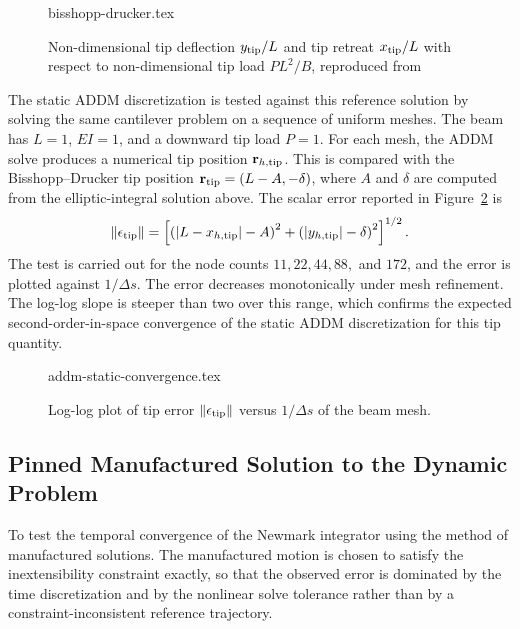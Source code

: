 \begin{figure}[H]
    \centering
    {bisshopp-drucker.tex}
    \caption{Non-dimensional tip deflection \(y_{\rm tip}/L\) and tip retreat \(x_{\rm tip}/L\) with respect to non-dimensional tip load \(PL^2/B\), reproduced from \textcite{bisshopp_large_1945}}
    \label{fig:bisshopp-drucker-reference}
\end{figure}

The static ADDM discretization is tested against this reference solution by
solving the same cantilever problem on a sequence of uniform meshes. The beam
has \(L=1\), \(EI=1\), and a downward tip load \(P=1\). For each mesh, the ADDM
solve produces a numerical tip position \(\vec r_{h,\rm tip}\). This is
compared with the Bisshopp--Drucker tip position \(\vec r_{\rm
tip}=(L-A,-\delta)\), where \(A\) and \(\delta\) are computed from the
elliptic-integral solution above. The scalar error reported in
Figure~\ref{fig:bisshopp-drucker-convergence} is
\begin{equation*}
    \norm{\vec \epsilon_{\rm tip}}
    =
    \left[
        \left(\abs{L-x_{h,\rm tip}}-A\right)^2
        +
        \left(\abs{y_{h,\rm tip}}-\delta\right)^2
        \right]^{1/2}.
\end{equation*}
The test is carried out for the node counts
\(11,22,44,88,\) and \(172\), and the error is plotted against
\(1/\Delta s\). The error decreases monotonically under mesh refinement. The
log-log slope is steeper than two over this range, which confirms the expected
second-order-in-space convergence of the static ADDM discretization for this
tip quantity.

\begin{figure}[H]
    \centering
    {addm-static-convergence.tex}
    \caption{Log-log plot of tip error \(\norm{\vec {\epsilon}_{\rm tip}}\) versus \(1/\Delta s\) of the beam mesh.}
    \label{fig:bisshopp-drucker-convergence}
\end{figure}

\subsection{Pinned Manufactured Solution to the Dynamic Problem}

To test the temporal convergence of the Newmark integrator using the method of
manufactured solutions. The manufactured motion is chosen to satisfy the
inextensibility constraint exactly, so that the observed error is dominated by
the time discretization and by the nonlinear solve tolerance rather than by a
constraint-inconsistent reference trajectory.

